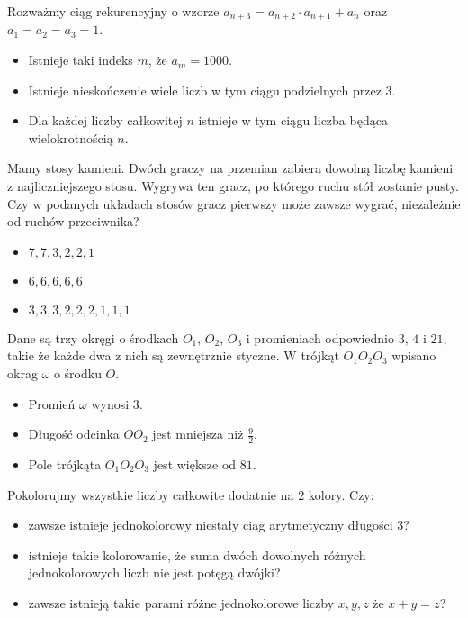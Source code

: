 \documentclass[12pt, a4paper]{article}
\newcommand{\question}[1]{\normalitem \begin{samepage}#1 \end{samepage}}
\newcommand{\questionwithasterix}[1]{ \asterixitem \begin{samepage}#1 \vspace{6cm}\end{samepage}}
\newcommand{\cmark}{\textcolor{green}{T}}%
\newcommand{\xmark}{\textcolor{red}{N}}%
\newcommand{\yes}{\rlap{\framebox(15,15)} {\raisebox{2pt}{\large\hspace{-1pt}\cmark}}%
\hspace{3pt}}
\newcommand{\no}{\rlap{\framebox(15,15)} {\raisebox{2pt}{\large\hspace{-1pt}\xmark}}%
\hspace{3pt}}
\begin{document}
\begin{enumerate}
	\question {
		Rozważmy ciąg rekurencyjny o wzorze $a_{n+3}=a_{n+2} \cdot a_{n+1}+a_{n}$ oraz $a_1=a_2=a_3=1$.
	
		\begin{itemize}
			\item [\no] Istnieje taki indeks $m$, że $a_m=1000$.
			\item [\yes]Istnieje nieskończenie wiele liczb w tym ciągu podzielnych przez $3$.
			\item [\yes]Dla każdej liczby całkowitej $n$ istnieje w tym ciągu liczba będąca wielokrotnością $n$.
		\end{itemize}
	}
	
	\questionwithasterix {
		Mamy stosy kamieni. Dwóch graczy na przemian zabiera dowolną liczbę kamieni z najliczniejszego stosu. Wygrywa ten gracz, po którego ruchu stół zostanie pusty. Czy w podanych układach stosów gracz pierwszy może zawsze wygrać, niezależnie od ruchów przeciwnika?
	
		\begin{itemize}
			\item [\no]$7,7,3,2,2,1$
			\item [\yes]$6,6,6,6,6$
			\item [\yes]$3,3,3,2,2,2,1,1,1$ 
		\end{itemize}
	}
	
	\question {
		Dane są trzy okręgi o środkach $O_1$, $O_2$, $O_3$ i promieniach odpowiednio $3$, $4$ i $21$, takie że każde dwa z nich są zewnętrznie styczne. W trójkąt $O_1 O_2 O_3$ wpisano okrag $\omega$ o środku $O$.
	
		\begin{itemize}
			\item [\yes]Promień $\omega$ wynosi $3$.
			\item [\no]Długość odcinka $OO_2$ jest mniejsza niż $\frac{9}{2}$.
			\item [\yes]Pole trójkąta $O_1O_2O_3$ jest większe od $81$.
		\end{itemize}
	}
	
	\question {
		Pokolorujmy wszystkie liczby całkowite dodatnie na $2$ kolory. Czy:
	
		\begin{itemize}
			\item [\yes]zawsze istnieje jednokolorowy niestały ciąg arytmetyczny długości $3$?
			\item [\yes]istnieje takie kolorowanie, że suma dwóch dowolnych różnych jednokolorowych liczb nie jest potęgą dwójki?
			\item [\yes]zawsze istnieją takie parami różne jednokolorowe liczby $x, y, z$ że $x+y=z$?
		\end{itemize}
	}
	

\end{enumerate}
\end{document}
